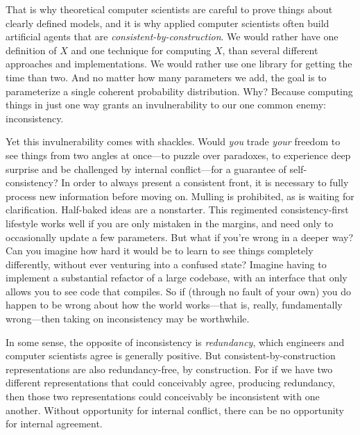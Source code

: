 That is why theoretical computer scientists are careful to prove things about clearly defined models,
and it is why applied computer scientists often build artificial agents that are \emph{consistent-by-construction}.
%
We would rather have one definition of $X$ and one technique for computing $X$, than several different approaches and implementations. 
We would rather use one library for getting the time than two. 
And no matter how many parameters we add, the goal is to parameterize a single coherent probability distribution. 
%
Why? Because computing things in just one way grants an invulnerability to our one common enemy: inconsistency.

Yet this invulnerability comes with shackles.
Would \emph{you} trade \emph{your} freedom to see things from two angles at once---to puzzle over paradoxes, to experience deep surprise and be challenged by internal conflict---for a guarantee of self-consistency?
%
In order to always present a consistent front, it is necessary to fully process new information before moving on. Mulling is prohibited, as
is waiting for clarification.
Half-baked ideas are a nonstarter.
This regimented consistency-first lifestyle works well if you are only mistaken in the margins, and need only to occasionally update a few parameters.
But what if you're wrong in a deeper way?
Can you imagine how hard it would be to learn to see things completely differently, without ever venturing into a confused state?
Imagine having to implement a substantial refactor of a large codebase, with an interface that only allows you to see code that compiles.
So if (through no fault of your own) you do happen to be wrong about how the world works---that is, really, fundamentally wrong---then taking on inconsistency may be worthwhile.


In some sense, the opposite of inconsistency is \emph{redundancy}, which engineers and computer scientists agree is generally positive. 
But consistent-by-construction representations are also redundancy-free, by construction. 
For if we have two different representations that could conceivably agree, producing redundancy, then those two representations could conceivably be inconsistent with one another. 
Without opportunity for internal conflict, there can be no opportunity for internal agreement. 

